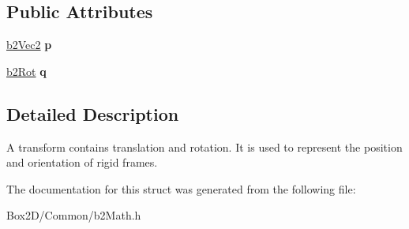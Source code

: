 \subsection*{Public Attributes}
\begin{DoxyCompactItemize}
\item 
\mbox{\label{structb2_transform_a9eeeb643a016c29a4d389e480ba6c628}} 
\hyperlink{structb2_vec2}{b2\+Vec2} {\bfseries p}
\item 
\mbox{\label{structb2_transform_ae4aaac23f32686e165138c4e5dc4ce85}} 
\hyperlink{structb2_rot}{b2\+Rot} {\bfseries q}
\end{DoxyCompactItemize}


\subsection{Detailed Description}
A transform contains translation and rotation. It is used to represent the position and orientation of rigid frames. 

The documentation for this struct was generated from the following file\+:\begin{DoxyCompactItemize}
\item 
Box2\+D/\+Common/b2\+Math.\+h\end{DoxyCompactItemize}
